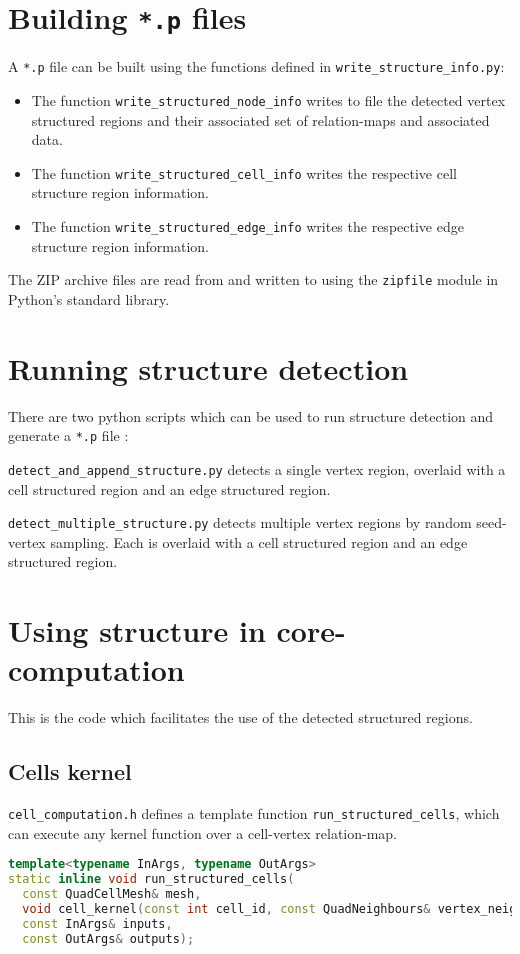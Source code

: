 \section{Building \texttt{*.p} files}
A \texttt{*.p} file can be built using the functions defined in \texttt{write\_structure\_info.py}:
\begin{itemize}
\item The function \lstinline|write_structured_node_info| writes to file the detected vertex structured regions and their associated set of relation-maps and associated data.
\item The function \lstinline|write_structured_cell_info| writes the respective cell structure region information.
\item The function \lstinline|write_structured_edge_info| writes the respective edge structure region information.
\end{itemize}

The ZIP archive files are read from and written to using the \lstinline|zipfile| module in Python's standard library.


\section{Running structure detection}
There are two python scripts which can be used to run structure detection and generate a \texttt{*.p} file :
\begin{enumerate*}[label=\alph*)]
\item \texttt{detect\_and\_append\_structure.py} detects a single vertex region, overlaid with a cell structured region and an edge structured region.
\item \texttt{detect\_multiple\_structure.py} detects multiple vertex regions by random seed-vertex sampling. Each is overlaid with a cell structured region and an edge structured region.
\end{enumerate*}


\section{Using structure in core-computation}
This is the code which facilitates the use of the detected structured regions.

\subsection{Cells kernel}
\texttt{cell\_computation.h} defines a template function \lstinline|run_structured_cells|, which can execute any kernel function over a cell-vertex relation-map.
\begin{lstlisting}[language=c++]
template<typename InArgs, typename OutArgs>
static inline void run_structured_cells(
  const QuadCellMesh& mesh,
  void cell_kernel(const int cell_id, const QuadNeighbours& vertex_neighbours, const QuadCellMesh&, const InArgs&, const OutArgs&),
  const InArgs& inputs,
  const OutArgs& outputs);
\end{lstlisting}

